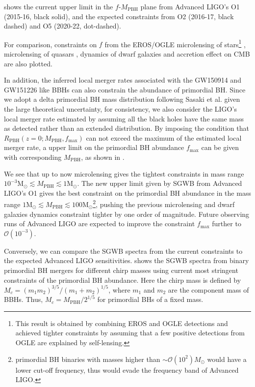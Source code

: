  shows the current upper limit in the $f$-$M_{\textrm {PBH}}$ plane from Advanced LIGO's O1 (2015-16, black solid), and the expected constraints from O2 (2016-17, black dashed) and O5 (2020-22, dot-dashed).

For comparison, constraints on $f$ from the EROS/OGLE microlensing of stars\footnote{This result is obtained by combining EROS and OGLE detections and achieved tighter constraints by  assuming that a few positive detections from OGLE are explained by self-lensing.} \cite{Novati:2013fxa} , microlensing of quasars \cite{Mediavilla:2009um}, dynamics of dwarf galaxies \cite{Koushiappas:2017chw} and accretion effect on \ac{CMB} \cite{Ali-Haimoud:2016mbv} are also plotted. 

In addition, the inferred local merger rates associated with the GW150914 and GW151226 like \acp{BBH} can also constrain the abundance of primordial \ac{BH}. Since we adopt a delta primordial \ac{BH} mass distribution following Sasaki et al. given the large theoretical uncertainty, for consistency, we also consider the LIGO's local merger rate estimated by assuming all the black holes have the same mass as detected rather than an extended distribution. By imposing the condition that $R_{\textrm{PBH}}(z=0;M_\text{PBH},f_\textrm{max})$ can not exceed the maximum of the estimated local merger rate, a upper limit on the primordial \ac{BH} abundance $f_\textrm{max}$ can be given with corresponding $M_\textrm{PBH}$, as shown in .

We see that up to now microlensing gives the tightest constraints in mass range $10^{-3}\mathrm{M}_\odot\lesssim M_\text{PBH}\lesssim 1 \mathrm{M}_\odot$. The new upper limit given by \ac{SGWB} from Advanced LIGO's O1 gives the best constraint on the primordial \ac{BH} abundance in the mass range $1 \mathrm{M}_\odot \lesssim M_\text{PBH}\lesssim 100 \mathrm{M}_\odot$\footnote{
primordial \ac{BH} binaries with masses higher than $\sim\mathcal{O}(10^2)M_\odot$ would have a lower cut-off frequency, thus would evade the frequency band of Advanced LIGO.},
pushing the previous microlensing and dwarf galaxies dynamics constraint tighter by one order of magnitude.
Future observing runs of Advanced LIGO are expected to improve the constraint $f_\textrm{max}$ further to $\mathcal{O}(10^{-3})$. 

Conversely, we can compare the \ac{SGWB} spectra from the current constraints to the expected Advanced LIGO sensitivities. 
 shows the \ac{SGWB} spectra from binary primordial \ac{BH} mergers for different chirp masses using current most stringent constraints of the primordial \ac{BH} abundance.
Here the chirp mass is defined by $M_c=(m_1m_2)^{3/5}/(m_1+m_2)^{1/5}$, where $m_1$ and $m_2$ are the component mass of \acp{BBH}. Thus, $M_c = M_\textrm{PBH}/2^{1/5}$ for primordial \acp{BH} of a fixed mass.

